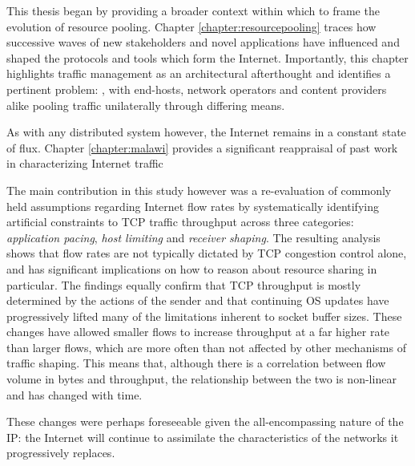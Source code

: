 This thesis began by providing a broader context within which to frame the evolution of resource pooling.
Chapter \ref{chapter:resourcepooling} traces how successive waves of new stakeholders and novel applications have influenced and shaped the protocols and tools which form the Internet.
Importantly, this chapter highlights traffic management as an architectural afterthought and identifies a pertinent problem:
, with end-hosts, network operators and content providers alike pooling traffic unilaterally through differing means.


As with any distributed system however, the Internet remains in a constant state of flux.
\LOREM
Chapter \ref{chapter:malawi} provides a significant reappraisal of past work in characterizing Internet traffic

The main contribution in this study however was a re-evaluation of commonly held assumptions regarding Internet flow rates by systematically identifying artificial constraints to \ac{TCP} traffic throughput across three categories: \emph{application pacing}, \emph{host limiting} and \emph{receiver shaping}. 
The resulting analysis shows that flow rates are not typically dictated by \ac{TCP} congestion control alone, and has significant implications on how to reason about resource sharing in particular.
The findings equally confirm that \ac{TCP} throughput is mostly determined by the actions of the sender and that continuing \acf{OS} updates have progressively lifted many of the limitations inherent to socket buffer sizes. 
These changes have allowed smaller flows to increase throughput at a far higher rate than larger flows, which are more often than not affected by other mechanisms of traffic shaping.
This means that, although there is a correlation between flow volume in bytes and throughput, the relationship between the two is non-linear and has changed with time.

These changes were perhaps foreseeable given the all-encompassing nature of the \ac{IP}: the Internet will continue to assimilate the characteristics of the networks it progressively replaces.







